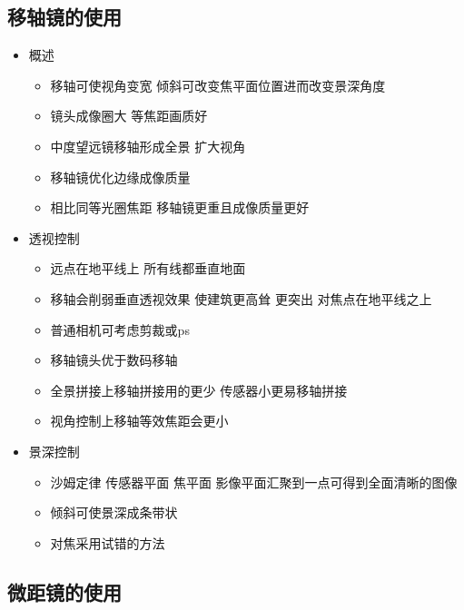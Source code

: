 \documentclass[
  letterpaper,
  DIV=11,
  numbers=noendperiod]{scrreprt}
\providecommand{\tightlist}{%
  \setlength{\itemsep}{0pt}\setlength{\parskip}{0pt}}\usepackage{longtable,booktabs,array}
\begin{document}
\subsection{移轴镜的使用}\label{ux79fbux8f74ux955cux7684ux4f7fux7528}

\begin{itemize}
\tightlist
\item
  概述

  \begin{itemize}
  \tightlist
  \item
    移轴可使视角变宽 倾斜可改变焦平面位置进而改变景深角度
  \item
    镜头成像圈大 等焦距画质好
  \item
    中度望远镜移轴形成全景 扩大视角
  \item
    移轴镜优化边缘成像质量
  \item
    相比同等光圈焦距 移轴镜更重且成像质量更好
  \end{itemize}
\item
  透视控制

  \begin{itemize}
  \tightlist
  \item
    远点在地平线上 所有线都垂直地面
  \item
    移轴会削弱垂直透视效果 使建筑更高耸 更突出 对焦点在地平线之上
  \item
    普通相机可考虑剪裁或ps
  \item
    移轴镜头优于数码移轴
  \item
    全景拼接上移轴拼接用的更少 传感器小更易移轴拼接
  \item
    视角控制上移轴等效焦距会更小
  \end{itemize}
\item
  景深控制

  \begin{itemize}
  \tightlist
  \item
    沙姆定律 传感器平面 焦平面 影像平面汇聚到一点可得到全面清晰的图像
  \item
    倾斜可使景深成条带状
  \item
    对焦采用试错的方法
  \end{itemize}
\end{itemize}

\subsection{微距镜的使用}\label{ux5faeux8dddux955cux7684ux4f7fux7528}
\end{document}
